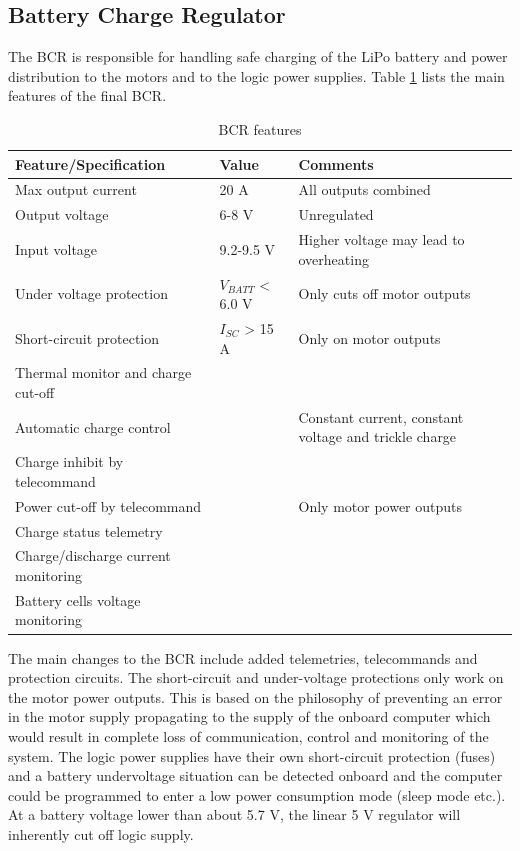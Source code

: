 \subsection{Battery Charge Regulator}
\label{sec:changes_BCR}
%
The \ac{BCR} is responsible for handling safe charging of the \ac{LiPo} battery and power distribution to the motors and to the logic power supplies. Table \ref{tab:BCR_features} lists the main features of the final \ac{BCR}.
%
\begin{table}[H]
\centering
\caption{\ac{BCR} features}
\label{tab:BCR_features}
\begin{tabular}{p{}p{}p{}}
\hline
\textbf{Feature/Specification} & \textbf{Value} & \textbf{Comments}\\
\hline
Max output current & 20 A & All outputs combined \\
Output voltage & 6-8 V & Unregulated \\
Input voltage & 9.2-9.5 V & Higher voltage may lead to overheating\\
Under voltage protection & $V_{BATT}$ < 6.0 V & Only cuts off motor outputs \\
Short-circuit protection & $I_{SC}$ > 15 A & Only on motor outputs \\
Thermal monitor and charge cut-off & & \\
Automatic charge control &  & Constant current, constant voltage and trickle charge\\
Charge inhibit by telecommand & & \\
Power cut-off by telecommand & & Only motor power outputs\\
Charge status telemetry & &\\
Charge/discharge current monitoring & & \\
Battery cells voltage monitoring & & \\
\hline
\end{tabular}
\end{table} 
%
\noindent
The main changes to the \ac{BCR} include added telemetries, telecommands and protection circuits. The short-circuit and under-voltage protections only work on the motor power outputs. This is based on the philosophy of preventing an error in the motor supply propagating to the supply of the onboard computer which would result in complete loss of communication, control and monitoring of the system. The logic power supplies have their own short-circuit protection (fuses) and a battery undervoltage situation can be detected onboard and the computer could be programmed to enter a low power consumption mode (sleep mode etc.). At a battery voltage lower than about 5.7 V, the linear 5 V regulator will inherently cut off logic supply.\\\\
